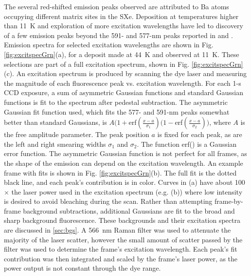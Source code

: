 

The several red-shifted emission peaks observed are attributed to Ba atoms occupying different matrix sites in the SXe.  Deposition at temperatures higher than 11~K and exploration of more excitation wavelengths have led to discovery of a few emission peaks beyond the 591- and 577-nm peaks reported in \cite{Shon} and \cite{Brian}.  Emission spectra for selected excitation wavelengths are shown in Fig. \ref{fig:excitspecGrn}(a), for a deposit made at 44~K and observed at 11~K.  These selections are part of a full excitation spectrum, shown in Fig. \ref{fig:excitspecGrn}(c).  An excitation spectrum is produced by scanning the dye laser and measuring the magnitude of each fluorescence peak vs. excitation wavelength.  For each 1-s CCD exposure, a sum of asymmetric Gaussian functions and standard Gaussian functions is fit to the spectrum after pedestal subtraction.  The asymmetric Gaussian fit function used, which fits the 577- and 591-nm peaks somewhat better than standard Gaussians, is $A(1+$erf$(\frac{x-a}{\sigma_{1}})(1-$erf$(\frac{x-a}{\sigma_{2}}))$, where $A$ is the free amplitude parameter.  The peak position $a$ is fixed for each peak, as are the left and right smearing widths $\sigma_{1}$ and $\sigma_{2}$.  The function erf() is a Gaussian error function.  The asymmetric Gaussian function is not perfect for all frames, as the shape of the emission can depend on the excitation wavelength.  An example frame with fits is shown in Fig. \ref{fig:excitspecGrn}(b).  The full fit is the dotted black line, and each peak's contribution is in color.  Curves in (a) have about 100$\times$ the laser power used in the excitation spectrum (e.g. (b)) where low intensity is desired to avoid bleaching during the scan.  Rather than attempting frame-by-frame background subtractions, additional Gaussians are fit to the broad and sharp background fluorescence.  These backgrounds and their excitation spectra are discussed in \ref{sec:bgs}.  A 566~nm Raman filter was used to attenuate the majority of the laser scatter, however the small amount of scatter passed by the filter was used to determine the frame's excitation wavelength.  Each peak's fit contribution was then integrated and scaled by the frame's laser power, as the power output is not constant through the dye range.

